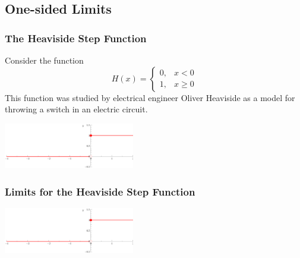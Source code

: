 \documentclass[serif,ignorenonframetext]{beamer}
\begin{document}
\subsection{One-sided Limits}

\begin{frame}
  \frametitle{The Heaviside Step Function}
  Consider the function
  \begin{displaymath}
    H(x) = \begin{cases}
      0, & x<0 \\
      1, & x\ge 0
    \end{cases}
  \end{displaymath}
  This function was studied by electrical engineer Oliver Heaviside as 
  a model for throwing a switch in an electric circuit.
  \pause
  \begin{center}
    \includegraphics[height=2cm]{heav1.eps}
  \end{center}
\end{frame}

\begin{frame}
  \frametitle{Limits for the Heaviside Step Function}
  \begin{itemize}
  \end{itemize}
  \begin{center}
    \includegraphics[height=2cm]{heav1.eps}
  \end{center}
\end{frame}
\end{document}
